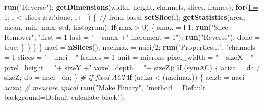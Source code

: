 \documentclass[11pt,singlespacinge,twoside]{reedthesis} %
\newenvironment{Shaded}{}{}
\newcommand{\CommentTok}[1]{\textit{#1}}
\newcommand{\ControlFlowTok}[1]{\textbf{#1}}
\newcommand{\DataTypeTok}[1]{\underline{#1}}
\newcommand{\DecValTok}[1]{#1}
\newcommand{\ErrorTok}[1]{\textbf{#1}}
\newcommand{\KeywordTok}[1]{\textbf{#1}}
\newcommand{\NormalTok}[1]{#1}
\newcommand{\OperatorTok}[1]{#1}
\newcommand{\StringTok}[1]{#1}
\theoremstyle{definition}
\theoremstyle{definition}
\theoremstyle{definition}
\theoremstyle{remark}
\begin{document}
\begin{Shaded}
\begin{Highlighting}[numbers=left,,]
            \KeywordTok{run}\NormalTok{(}\StringTok{"Reverse"}\NormalTok{);}
            \KeywordTok{getDimensions}\NormalTok{(width, height, channels, slices, frames);}
            \ControlFlowTok{for}\NormalTok{(}\DataTypeTok{l =} \DecValTok{1}\NormalTok{; l }\OperatorTok{<}\StringTok{ }\NormalTok{slices }\OperatorTok{&&!}\NormalTok{done; l}\OperatorTok{++}\NormalTok{) \{ }\OperatorTok{/}\ErrorTok{/}\StringTok{ }\NormalTok{from basal}
                  \KeywordTok{setSlice}\NormalTok{(l);}
                    \KeywordTok{getStatistics}\NormalTok{(area, mean, min, max, std, histogram);}
                    \ControlFlowTok{if}\NormalTok{(max }\OperatorTok{>}\StringTok{ }\DecValTok{0}\NormalTok{) \{}
\NormalTok{                      smax =}\StringTok{ }\NormalTok{l}\DecValTok{-1}\NormalTok{;}
                        \KeywordTok{run}\NormalTok{(}\StringTok{"Slice Remover"}\NormalTok{, }\StringTok{"first = 1 last = "}\OperatorTok{+}\StringTok{ }\NormalTok{smax }\OperatorTok{+}\StringTok{" increment = 1"}\NormalTok{);}
                        \KeywordTok{run}\NormalTok{(}\StringTok{"Reverse"}\NormalTok{);}
\NormalTok{                        done =}\StringTok{ }\NormalTok{true;}
\NormalTok{                    \}}
\NormalTok{                \}}
\NormalTok{            \}}
\NormalTok{        \}}
\NormalTok{        naci =}\StringTok{ }\KeywordTok{nSlices}\NormalTok{();}
\NormalTok{        nacimax =}\StringTok{ }\NormalTok{naci}\OperatorTok{/}\DecValTok{2}\NormalTok{;}
        \KeywordTok{run}\NormalTok{(}\StringTok{"Properties..."}\NormalTok{, }\StringTok{"channels = 1 slices = "}\OperatorTok{+}\StringTok{ }\NormalTok{naci }\OperatorTok{+}\StringTok{" frames = 1 unit = microns }
\StringTok{            pixel_width = "}\OperatorTok{+}\StringTok{ }\NormalTok{sizeX }\OperatorTok{+}\StringTok{" pixel_height = "}\OperatorTok{+}\StringTok{ }\NormalTok{sizeY }\OperatorTok{+}\StringTok{" voxel_depth = "}\OperatorTok{+}\StringTok{ }\NormalTok{sizeZ);}
        \ControlFlowTok{if}\NormalTok{ (symAC) \{}
\NormalTok{            aciza =}\StringTok{ }\NormalTok{da }\OperatorTok{/}\StringTok{ }\NormalTok{sizeZ;}
\NormalTok{            db =}\StringTok{ }\NormalTok{naci }\OperatorTok{-}\StringTok{ }\NormalTok{da;}
\NormalTok{        \}}
    \CommentTok{# if fixed ACI}
        \ControlFlowTok{if}\NormalTok{ (aciza }\OperatorTok{<}\StringTok{ }\NormalTok{(nacimax)) \{}
\NormalTok{          acizb =}\StringTok{ }\NormalTok{naci }\OperatorTok{-}\StringTok{ }\NormalTok{aciza;}
    \CommentTok{# measure apical}
        \KeywordTok{run}\NormalTok{(}\StringTok{"Make Binary"}\NormalTok{, }\StringTok{"method = Default background=Default calculate black"}\NormalTok{);}

\end{Highlighting}
\end{Shaded}
\end{document}
